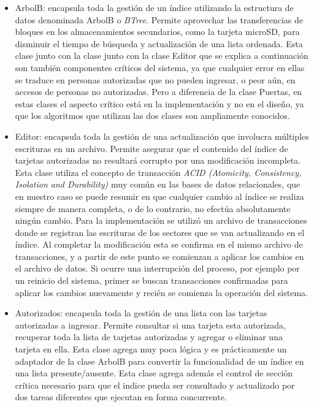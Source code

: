 \begin{itemize}
\FloatBarrier
	
	\item ArbolB: encapsula toda la gestión de un índice utilizando la estructura de datos denominada ArbolB  o \emph{BTree}. Permite aprovechar las transferencias de bloques en los almacenamientos secundarios, como la tarjeta microSD, para disminuir el tiempo de búsqueda y actualización de una lista ordenada. Esta clase junto con la clase junto con la clase Editor que se explica a continuación son también componentes críticos del sistema, ya que cualquier error en ellas se traduce en personas autorizadas que no pueden ingresar, o peor aún, en accesos de personas no autorizadas. Pero a diferencia de la clase Puertas, en estas clases el aspecto crítico está en la implementación y no en el diseño, ya que los algoritmos que utilizan las dos clases son ampliamente conocidos.
		
	\item Editor: encapsula toda la gestión de una actualización que involucra múltiples escrituras en un archivo. Permite asegurar que el contenido del índice de tarjetas autorizadas no resultará corrupto por una modificación incompleta. Esta clase utiliza el concepto de transacción \emph{ACID (Atomicity, Consistency, Isolation and Durability)} muy común en las bases de datos relacionales, que en nuestro caso se puede resumir en que cualquier cambio al índice se realiza siempre de manera completa, o de lo contrario, no efectúa absolutamente ningún cambio. Para la implementación se utilizó un archivo de transacciones donde se registran las escrituras de los sectores que se van actualizando en el índice. Al completar la modificación esta se confirma en el mismo archivo de transacciones, y a partir de este punto se comienzan a aplicar los cambios en el archivo de datos. Si ocurre una interrupción del proceso, por ejemplo por un reinicio del sistema, primer se buscan transacciones confirmadas para aplicar los cambios nuevamente y recién se comienza la operación del sistema.

	\item Autorizados: encapsula toda la gestión de una lista con las tarjetas autorizadas a ingresar. Permite consultar si una tarjeta esta autorizada, recuperar toda la lista de tarjetas autorizadas y agregar o eliminar una tarjeta en ella. Esta clase agrega muy poca lógica y es prácticamente un adaptador de la clase ArbolB para convertir la funcionalidad de un índice en una lista presente/ausente. Esta clase agrega además el control de sección crítica necesario para que el indice pueda ser consultado y actualizado por dos tareas diferentes que ejecutan en forma concurrente.


\end{itemize}
